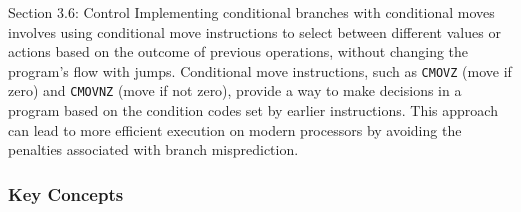\begin{notes}{Section 3.6: Control}
    Implementing conditional branches with conditional moves involves using conditional move instructions to select between different values or actions based on the outcome of previous operations, 
    without changing the program's flow with jumps. Conditional move instructions, such as \texttt{CMOVZ} (move if zero) and \texttt{CMOVNZ} (move if not zero), provide a way to make decisions in a 
    program based on the condition codes set by earlier instructions. This approach can lead to more efficient execution on modern processors by avoiding the penalties associated with branch misprediction.
    
    \subsubsection*{Key Concepts}
    

\end{notes}
